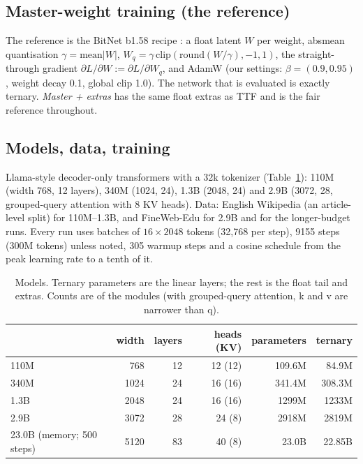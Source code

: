 \documentclass[10pt,twocolumn]{article}
\begin{document}
\subsection{Master-weight training (the reference)}
The reference is the BitNet b1.58 recipe \citep{ma2024era}: a float latent $W$ per weight, absmean quantisation
$\gamma=\mathrm{mean}|W|$, $W_q=\gamma\,\mathrm{clip}(\mathrm{round}(W/\gamma),-1,1)$, the straight-through gradient
$\partial L/\partial W := \partial L/\partial W_q$, and AdamW (our settings: $\beta=(0.9,0.95)$, weight decay 0.1, global clip 1.0). The
network that is evaluated is exactly ternary. \emph{Master + extras} has the same float extras as TTF and is the fair
reference throughout.

\subsection{Models, data, training}
Llama-style decoder-only transformers with a 32k tokenizer (Table~\ref{tab:models}): 110M (width 768, 12 layers), 340M
(1024, 24), 1.3B (2048, 24) and 2.9B (3072, 28, grouped-query attention with 8 KV heads). Data: English Wikipedia (an
article-level split) for 110M--1.3B, and FineWeb-Edu \citep{penedo2024fineweb} for 2.9B and for the longer-budget runs.
Every run uses batches of $16\times2048$ tokens (32,768 per step), 9155 steps (300M tokens) unless noted, 305 warmup
steps and a cosine schedule from the peak learning rate to a tenth of it.

\begin{table}[t]
\centering
\caption{Models. Ternary parameters are the linear layers; the rest is the float tail and extras. Counts are of the
modules (with grouped-query attention, k and v are narrower than q).}
\label{tab:models}
\begin{tabular}{lrrrrr}
\toprule
 & width & layers & heads (KV) & parameters & ternary \\
\midrule
110M & 768 & 12 & 12 (12) & 109.6M & 84.9M \\
340M & 1024 & 24 & 16 (16) & 341.4M & 308.3M \\
1.3B & 2048 & 24 & 16 (16) & 1299M & 1233M \\
2.9B & 3072 & 28 & 24 (8) & 2918M & 2819M \\
23.0B (memory; 500 steps) & 5120 & 83 & 40 (8) & 23.0B & 22.85B \\
\bottomrule
\end{tabular}
\end{table}
\end{document}
